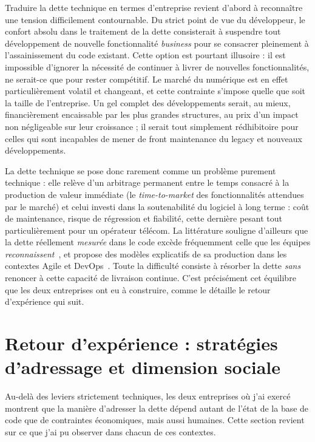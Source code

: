Traduire la dette technique en termes d'entreprise revient d'abord à reconnaître
une tension difficilement contournable. Du strict point de vue du développeur, le
confort absolu dans le traitement de la dette consisterait à suspendre tout
développement de nouvelle fonctionnalité \emph{business} pour se consacrer
pleinement à l'assainissement du code existant. Cette option est pourtant
illusoire : il est impossible d'ignorer la nécessité de continuer à livrer de
nouvelles fonctionnalités, ne serait-ce que pour rester compétitif. Le marché du
numérique est en effet particulièrement volatil et changeant, et cette contrainte
s'impose quelle que soit la taille de l'entreprise. Un gel complet des
développements serait, au mieux, financièrement encaissable par les plus grandes
structures, au prix d'un impact non négligeable sur leur croissance ; il serait
tout simplement rédhibitoire pour celles qui sont incapables de mener de front
maintenance du legacy et nouveaux développements.

La dette technique se pose donc rarement comme un problème purement technique :
elle relève d'un arbitrage permanent entre le temps consacré à la production de
valeur immédiate (le \emph{time-to-market} des fonctionnalités attendues par le
marché) et celui investi dans la soutenabilité du logiciel à long terme : coût
de maintenance, risque de régression et fiabilité, cette dernière pesant tout
particulièrement pour un opérateur télécom. La littérature souligne d'ailleurs
que la dette réellement \emph{mesurée} dans le code excède fréquemment celle que
les équipes \emph{reconnaissent}~\cite{pavlic2022}, et propose des modèles
explicatifs de sa production dans les contextes Agile et DevOps~\cite{kanita2022}.
Toute la difficulté consiste à
résorber la dette \emph{sans} renoncer à cette capacité de livraison continue.
C'est précisément cet équilibre que les deux entreprises ont eu à construire, comme le détaille le retour d'expérience qui suit.

\section{Retour d'expérience : stratégies d'adressage et dimension sociale}

Au-delà des leviers strictement techniques, les deux entreprises où j'ai
exercé montrent que la manière d'adresser la dette dépend autant de l'état de
la base de code que de contraintes économiques, mais aussi humaines. Cette section
revient sur ce que j'ai pu observer dans chacun de ces contextes.

